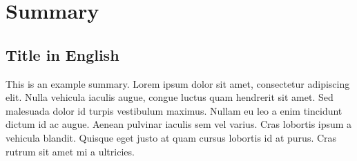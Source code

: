 \section*{Summary}
\subsection*{Title in English}
This is an example summary. Lorem ipsum dolor sit amet, consectetur adipiscing elit. Nulla vehicula iaculis augue, congue luctus quam hendrerit sit amet. Sed malesuada dolor id turpis vestibulum maximus. Nullam eu leo a enim tincidunt dictum id ac augue. Aenean pulvinar iaculis sem vel varius. Cras lobortis ipsum a vehicula blandit. Quisque eget justo at quam cursus lobortis id at purus. Cras rutrum sit amet mi a ultricies.
